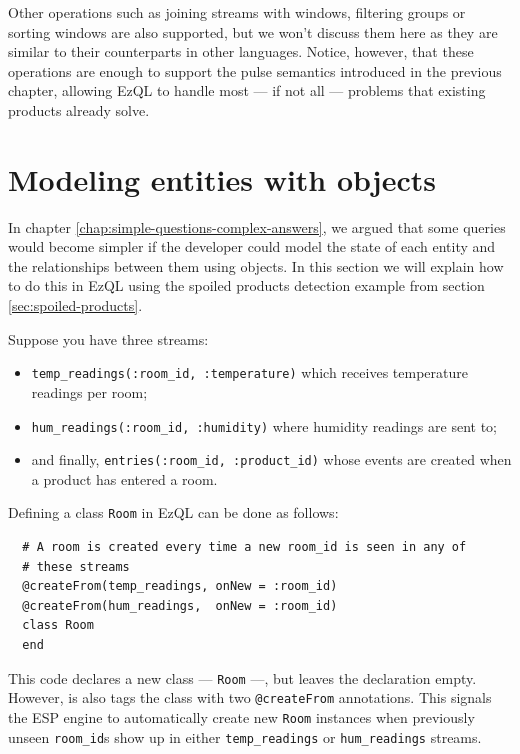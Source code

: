 \documentclass{report}
\begin{document}
Other operations such as joining streams with windows, filtering
groups or sorting windows are also supported, but we won't discuss
them here as they are similar to their counterparts in other
languages. Notice, however, that these operations are enough to
support the pulse semantics introduced in the previous chapter,
allowing EzQL to handle most --- if not all --- problems that existing
products already solve.

\section{Modeling entities with objects}
\label{sec:objects}

In chapter \ref{chap:simple-questions-complex-answers}, we argued that
some queries would become simpler if the developer could model the
state of each entity and the relationships between them using
objects. In this section we will explain how to do this in EzQL using
the spoiled products detection example from section
\ref{sec:spoiled-products}.

Suppose you have three streams:

\begin{itemize}
\item \verb=temp_readings(:room_id, :temperature)= which receives
  temperature readings per room;
\item \verb=hum_readings(:room_id, :humidity)= where humidity readings
  are sent to;
\item and finally, \verb=entries(:room_id, :product_id)= whose events
  are created when a product has entered a room.
\end{itemize}

Defining a class \verb=Room= in EzQL can be done as follows:

\begin{lstlisting}
  # A room is created every time a new room_id is seen in any of
  # these streams
  @createFrom(temp_readings, onNew = :room_id)
  @createFrom(hum_readings,  onNew = :room_id)
  class Room
  end
\end{lstlisting}

This code declares a new class --- \verb=Room= ---, but leaves the
declaration empty. However, is also tags the class with two
\verb=@createFrom= annotations. This signals the ESP engine to
automatically create new \verb=Room= instances when previously unseen
\verb=room_id=s show up in either \verb=temp_readings= or
\verb=hum_readings= streams.
\end{document}
